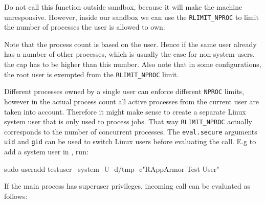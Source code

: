 Do not call this function outside sandbox, because it will make the machine
unresponsive. However, inside our sandbox we can use the \texttt{RLIMIT\_NPROC}
to limit the number of processes the user is allowed to own:

\begin{knitrout}\mycodesize
{}\color{fgcolor}\begin{kframe}
\begin{alltt}
\hlstd{(}\hlstd{(),}  \hlstd{=} \hlstd{)}
\end{alltt}


{\ttfamily\noindent\bfseries\color{errorcolor}{\#\# Error: unable to fork, possible reason: Resource temporarily unavailable}}\end{kframe}
\end{knitrout}


Note that the process count is based on the \Linux user. Hence if the same
\Linux user already has a number of other processes, which is usually the case
for non-system users, the cap has to be higher than this number. Also note that
in some \Linux configurations, the root user is exempted from the
\texttt{RLIMIT\_NPROC} limit.

Different processes owned by a single user can enforce different \texttt{NPROC}
limits, however in the actual process count all active processes from the
current user are taken into account. Therefore it might make sense to create a
separate Linux system user that is only used to process \R jobs. That way
\texttt{RLIMIT\_NPROC} actually corresponds to the number of concurrent \R
processes. The \texttt{eval.secure} arguments \texttt{uid} and \texttt{gid}
can be used to switch Linux users before evaluating the call. E.g to add a
system user in \Linux, run:

\begin{codeblock}
sudo useradd testuser --system -U -d/tmp -c"RAppArmor Test User"
\end{codeblock}

If the main \R process has superuser privileges, incoming call can be
evaluated as follows:

\begin{knitrout}\mycodesize
{}\color{fgcolor}\begin{kframe}
\begin{alltt}
\hlstd{(}\hlstd{(),}  \hlstd{=} \hlstd{,}  \hlstd{=} \hlstd{,}  \hlstd{=} \hlstd{)}
\end{alltt}
\end{kframe}
\end{knitrout}


